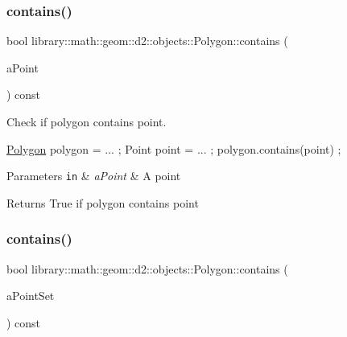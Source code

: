 \subsubsection{\texorpdfstring{contains()}{contains()}\hspace{0.1cm}{\footnotesize\ttfamily [1/2]}}
{\footnotesize\ttfamily bool library\+::math\+::geom\+::d2\+::objects\+::\+Polygon\+::contains (\begin{DoxyParamCaption}\item[{const \hyperlink{classlibrary_1_1math_1_1geom_1_1d2_1_1objects_1_1_point}{Point} \&}]{a\+Point }\end{DoxyParamCaption}) const}



Check if polygon contains point. 


\begin{DoxyCode}
\hyperlink{classlibrary_1_1math_1_1geom_1_1d2_1_1objects_1_1_polygon_ad2a0b0bcd5301dbcd9e2fa101fbd220b}{Polygon} polygon = ... ;
Point point = ... ;
polygon.contains(point) ;
\end{DoxyCode}



\begin{DoxyParams}[1]{Parameters}
\mbox{\tt in}  & {\em a\+Point} & A point \\
\hline
\end{DoxyParams}
\begin{DoxyReturn}{Returns}
True if polygon contains point 
\end{DoxyReturn}
\mbox{\label{classlibrary_1_1math_1_1geom_1_1d2_1_1objects_1_1_polygon_a750ce732c80c9efafa534fc3ae9d8a6f}} 
\subsubsection{\texorpdfstring{contains()}{contains()}\hspace{0.1cm}{\footnotesize\ttfamily [2/2]}}
{\footnotesize\ttfamily bool library\+::math\+::geom\+::d2\+::objects\+::\+Polygon\+::contains (\begin{DoxyParamCaption}\item[{const \hyperlink{classlibrary_1_1math_1_1geom_1_1d2_1_1objects_1_1_point_set}{Point\+Set} \&}]{a\+Point\+Set }\end{DoxyParamCaption}) const}



